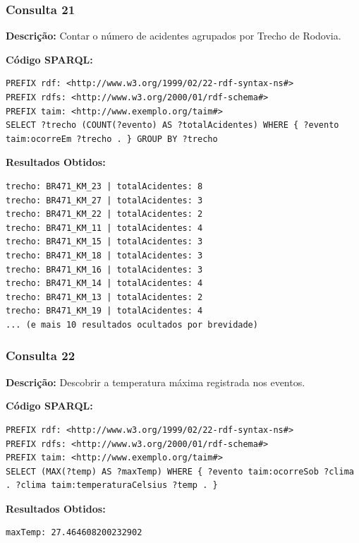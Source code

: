\documentclass[12pt,a4paper]{article}
\begin{document}
\vspace{1cm}
\subsubsection*{Consulta 21}

\textbf{Descrição:} Contar o número de acidentes agrupados por Trecho de Rodovia.

\textbf{Código SPARQL:}
\begin{lstlisting}
PREFIX rdf: <http://www.w3.org/1999/02/22-rdf-syntax-ns#>
PREFIX rdfs: <http://www.w3.org/2000/01/rdf-schema#>
PREFIX taim: <http://www.exemplo.org/taim#>
SELECT ?trecho (COUNT(?evento) AS ?totalAcidentes) WHERE { ?evento taim:ocorreEm ?trecho . } GROUP BY ?trecho
\end{lstlisting}

\textbf{Resultados Obtidos:}
\begin{lstlisting}
trecho: BR471_KM_23 | totalAcidentes: 8
trecho: BR471_KM_27 | totalAcidentes: 3
trecho: BR471_KM_22 | totalAcidentes: 2
trecho: BR471_KM_11 | totalAcidentes: 4
trecho: BR471_KM_15 | totalAcidentes: 3
trecho: BR471_KM_18 | totalAcidentes: 3
trecho: BR471_KM_16 | totalAcidentes: 3
trecho: BR471_KM_14 | totalAcidentes: 4
trecho: BR471_KM_13 | totalAcidentes: 2
trecho: BR471_KM_19 | totalAcidentes: 4
... (e mais 10 resultados ocultados por brevidade)
\end{lstlisting}

\vspace{1cm}
\subsubsection*{Consulta 22}

\textbf{Descrição:} Descobrir a temperatura máxima registrada nos eventos.

\textbf{Código SPARQL:}
\begin{lstlisting}
PREFIX rdf: <http://www.w3.org/1999/02/22-rdf-syntax-ns#>
PREFIX rdfs: <http://www.w3.org/2000/01/rdf-schema#>
PREFIX taim: <http://www.exemplo.org/taim#>
SELECT (MAX(?temp) AS ?maxTemp) WHERE { ?evento taim:ocorreSob ?clima . ?clima taim:temperaturaCelsius ?temp . }
\end{lstlisting}

\textbf{Resultados Obtidos:}
\begin{lstlisting}
maxTemp: 27.464608200232902
\end{lstlisting}

\vspace{1cm}
\end{document}
